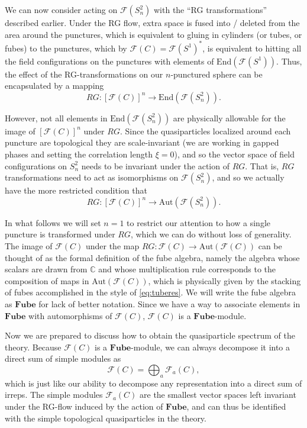 \documentclass[12pt,a4paper]{article}
\newcommand{\ra}{\rightarrow}
\newcommand{\cc}{\mathbb{C}}
\newcommand{\Aut}{\text{Aut}}
\newcommand\be            {\begin{equation}}
\newcommand\ee            {\end{equation}}
\newcommand{\End}{\text{End}}
\newcommand{\fube}{\textbf{Fube}}
\newcommand{\fld}{\mathcal{F}}
\begin{document}
We can now consider acting on $\fld(S^2_n)$ with the ``RG transformations'' described earlier. Under the RG flow, extra space is fused into / deleted from the area around the punctures, which is equivalent to gluing in cylinders (or tubes, or fubes) to the punctures, which by $\fld(C) = \fld(S^1)^*$, is equivalent to hitting all the field configurations on the punctures with elements of $\End(\fld(S^1))$. Thus, the effect of the RG-transformations on our $n$-punctured sphere can be encapsulated by a mapping 
\be RG: [\fld(C)]^n \ra \End(\fld(S^2_n)).\ee

However, not all elements in $\End(\fld(S^2_n))$ are physically allowable for the image of $[\fld(C)]^n$ under $RG$. Since the quasiparticles localized around each puncture are topological they are scale-invariant (we are working in gapped phases and setting the correlation length $\xi = 0$), and so the vector space of field configurations on $S^2_n$ needs to be invariant under the action of $RG$. 
That is, $RG$ transformations need to act as isomorphisms on $\fld(S^2_n)$, and so we actually have the more restricted condition that 
\be RG : [\fld(C)]^n \ra \Aut(\fld(S^2_n)). \ee

In what follows we will set $n=1$ to restrict our attention to how a single puncture is transformed under $RG$, which we can do without loss of generality. The image of $\fld(C)$ under the map $RG: \fld(C) \ra \text{Aut}(\fld(C))$ can be thought of as the formal definition of the fube algebra, namely the algebra whose scalars are drawn from $\cc$ and whose multiplication rule corresponds to the composition of maps in $\Aut(\fld(C))$, which is physically given by the stacking of fubes accomplished in the style of \eqref{eq:tuberes}. We will write the fube algebra as $\fube$ for lack of better notation. Since we have a way to associate elements in $\fube$ with automorphisms of $\fld(C)$, $\fld(C)$ is a $\fube$-module.


Now we are prepared to discuss how to obtain the quasiparticle spectrum of the theory. Because $\fld(C)$ is a $\fube$-module, we can always decompose it into a direct sum of simple modules as
\be \fld(C) = \bigoplus_a \fld_a(C),\ee
which is just like our ability to decompose any representation into a direct sum of irreps. The simple modules $\fld_a(C)$ are the smallest vector spaces left invariant under the RG-flow induced by the action of $\fube$, and can thus be identified with the simple topological quasiparticles in the theory. 
\end{document}
